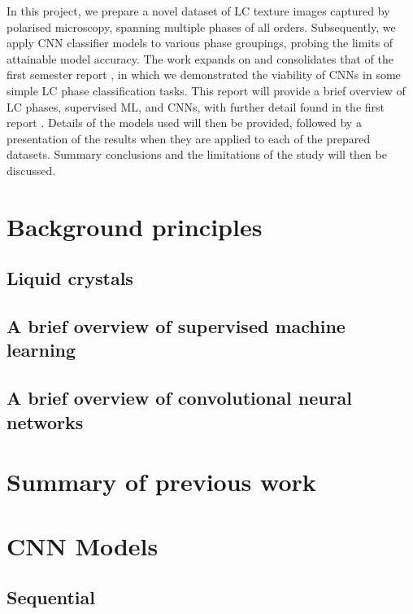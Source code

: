 \documentclass[12pt]{article}
\begin{document}
In this project, we prepare a novel dataset of LC texture images captured by polarised microscopy, spanning multiple phases of all orders. Subsequently, we apply CNN classifier models to various phase groupings, probing the limits of attainable model accuracy. The work expands on and consolidates that of the first semester report \cite{Heaton20}, in which we demonstrated the viability of CNNs in some simple LC phase classification tasks. This report will provide a brief overview of LC phases, supervised ML, and CNNs, with further detail found in the first report \cite{Heaton20}. Details of the models used will then be provided, followed by a presentation of the results when they are applied to each of the prepared datasets. Summary conclusions and the limitations of the study will then be discussed.
\section{Background principles}

\subsection{Liquid crystals}

\subsection{A brief overview of supervised machine learning}

\subsection{A brief overview of convolutional neural networks}

\section{Summary of previous work}

\section{CNN Models}

\subsection{Sequential}
\end{document}
